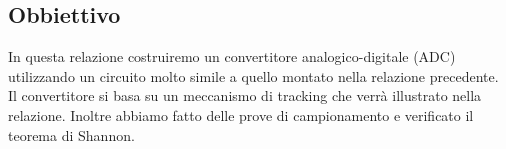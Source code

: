 \subsection{Obbiettivo}

In questa relazione costruiremo un convertitore analogico-digitale (ADC)
utilizzando un circuito molto simile a quello montato nella relazione precedente.
Il convertitore si basa su un meccanismo di tracking che verrà illustrato nella relazione.
Inoltre abbiamo fatto delle prove di campionamento e verificato il teorema di Shannon.
